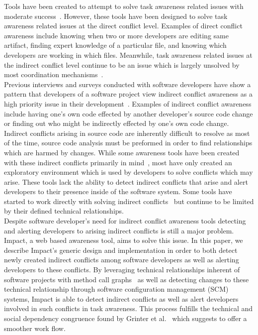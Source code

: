 \documentclass[conference]{IEEEtran}
\begin{document}
Tools have been created to attempt to solve task awareness related issues
with moderate success~\cite{Xiang:2008:ERT, Biehl:2007:FVD, Sarma:2009:TIV, 
Khurana:2009:PFC}. However, these tools have been designed 
to solve task awareness related issues at the direct conflict level. 
Examples of direct conflict awareness include knowing when two or more 
developers are  editing same artifact, finding expert knowledge of a
particular file, and knowing which developers are working in which files.
Meanwhile, task awareness related issues at the indirect conflict level
continue to be an issue which is largely unsolved by most coordination
mechanisms~\cite{Khurana:2009:PFC}.\\

Previous interviews and surveys conducted with software developers have 
show a pattern that developers of a software project view indirect conflict 
awareness  as a high priority issue in their development~\cite{Damian:2007:GSE, 
Halverson:2006:DTV, Begel:2010:CDE, Schroter:2012:TTF}. Examples 
of indirect conflict awareness
include having one's own code effected by another developer's source
code change or finding out who might be indirectly effected by one's
own code change. Indirect conflicts arising in source code are inherently
difficult to resolve as most of the time, source code analysis must
be preformed in order to find relationships which are harmed by changes.
While some awareness tools have been created with these indirect conflicts
primarily in mind~\cite{Begel:2010:CDE, Trainer:2005:BGT}, most have only 
created an exploratory environment which is used by developers to
solve conflicts which may arise. These tools lack the ability to detect
indirect conflicts that arise and alert developers to their presence 
inside of the software system. Some tools have started to work directly
with solving indirect conflicts~\cite{Sarma:2007:TSA} but continue
to be limited by their defined technical relationships.\\ 

Despite software developer's need for indirect conflict awareness tools
detecting and alerting developers to arising indirect conflicts is still a major
problem. Impact, a web based awareness
tool, aims to solve this issue. In this paper, we describe Impact's generic
design and implementation in order to both detect newly created
indirect conflicts among software developers as well as alerting developers
to these conflicts. By leveraging technical relationships inherent of 
software projects with method call graphs~\cite{Lakhotia:1993:CCM}
as well as detecting changes
to these technical relationship through software configuration management
(SCM) systems, Impact is able to detect indirect conflicts as well as
alert developers involved in such conflicts in task awareness. This process
fulfills the technical and social dependency congruence found by 
Grinter  et al.~\cite{Grinter:2003:RCW} which suggests to offer a smoother
work flow.\\
\end{document}
